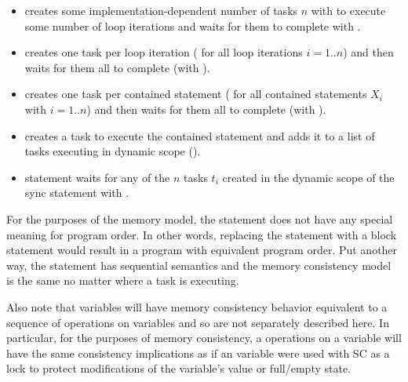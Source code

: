 \begin{itemize}

  \item {} creates some implementation-dependent number of tasks $n$
with  to execute some number of loop
iterations and waits for them to complete with .

  \item {} creates one task per loop iteration ( for all loop iterations $i=1..n$) and then waits for them
all to complete (with ).

  \item {} creates one task per contained statement ( for all contained statements $X_i$ with $i=1..n$) and then
waits for them all to complete (with ).

  \item {} creates a task to execute the contained statement and adds
it to a list of tasks executing in dynamic scope ().

  \item {} statement waits for  any of the $n$ tasks $t_i$ created in
the dynamic scope of the sync statement with .

\end{itemize}

For the purposes of the memory model, the  statement does not have any
special meaning for program order. In other words, replacing the 
statement with a block statement would result in a program with equivalent
program order. Put another way, the  statement has sequential
semantics and the memory consistency model is the same no matter where a task
is executing.

Also note that  variables will have memory consistency behavior
equivalent to a sequence of operations on  variables and so are
not separately described here. In particular, for the purposes of memory
consistency, a operations on a  variable will have the same
consistency implications as if an  variable were used with
SC as a lock to protect modifications of the 
variable's value or full/empty state.

